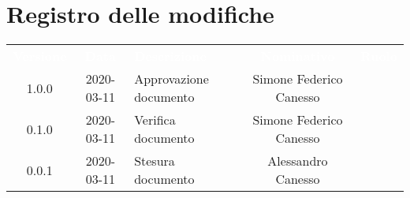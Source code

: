 \section*{Registro delle modifiche}
{
	\centering
	\begin{longtable}{ c c  C{4cm}  c  c }
		\textcolor{white}{\textbf{Versione}} & \textcolor{white}{\textbf{Data}} & \textcolor{white}{\textbf{Descrizione}} & \textcolor{white}{\textbf{Nominativo}} & \textcolor{white}{\textbf{Ruolo}}\\		
		1.0.0 & 2020-03-11 & Approvazione documento & Simone Federico Canesso &\RdP{}\\		
		0.1.0 & 2020-03-11 & Verifica documento & Simone Federico Canesso &\ver{}\\		
		0.0.1 & 2020-03-11 & Stesura documento & Alessandro Canesso &\reda{}\\		
		
	\end{longtable}

}